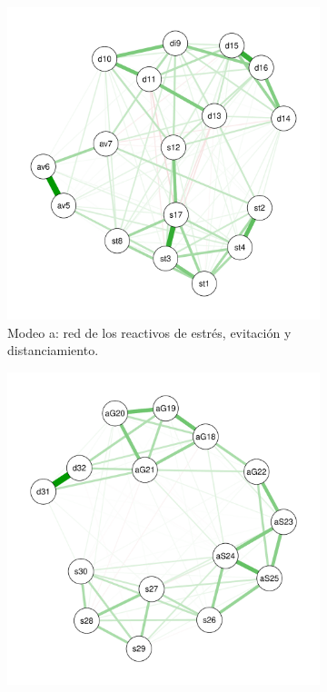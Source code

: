 \documentclass[11pt,spanish]{article}\usepackage[]{graphicx}\usepackage[]{color}
\begin{document}
\begin{figure}
\centering
\begin{subfigure}{0.45\textwidth}
    \includegraphics[width=\textwidth]{images/net_pcl5.pdf}
    \caption{Modeo a: red de los reactivos de estrés, evitación y distanciamiento. }
    \label{fig:netpcl5}
\end{subfigure}
\hfill
\begin{subfigure}{0.45\textwidth}
    \includegraphics[width=\textwidth]{images/net_dean.pdf}

\end{subfigure}
\end{figure}
\end{document}
